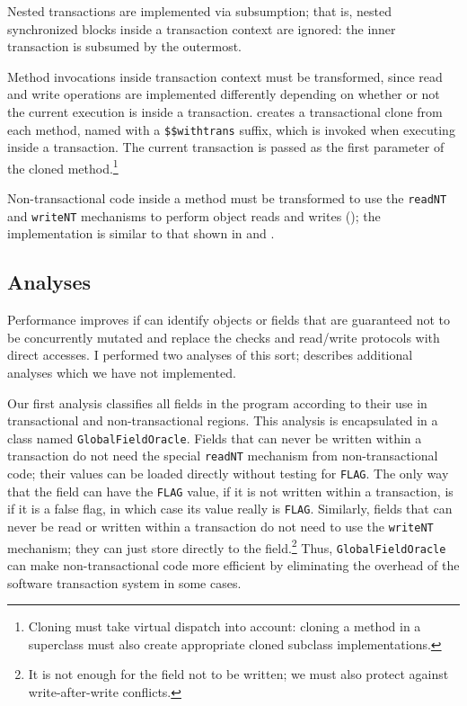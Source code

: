 Nested transactions are implemented via subsumption; that is, nested
synchronized blocks inside a transaction context are ignored: the
inner transaction is subsumed by the outermost.

\label{sec:withtrans}
Method invocations inside transaction context must be transformed,
since read and write operations are implemented differently depending
on whether or not the current execution is inside a transaction.  \Flex
creates a transactional clone from each method, named with a
\texttt{\$\$withtrans} suffix, which is invoked when executing
inside a transaction.  The current transaction is passed as the first
parameter of the cloned method.\footnote{Cloning must take virtual
  dispatch into account: cloning a method in a superclass must also
  create appropriate cloned subclass implementations.}

Non-transactional code inside a method must be transformed to use the
\texttt{readNT} and \texttt{writeNT} mechanisms to perform object
reads and writes (); the implementation is similar to
that shown in  and .

\subsection{Analyses}\label{sec:hoist} %
Performance improves if \flex can identify objects or fields
that are guaranteed not to be concurrently mutated and replace the
checks and read/write protocols with direct accesses.  I performed two
analyses of this sort;  describes additional analyses
which we have not implemented.

Our first analysis classifies all fields in the program according to
their use in transactional and non-transactional regions.  This
analysis is encapsulated in a \flex class named
\texttt{GlobalFieldOracle}.  Fields that can never be written within
a transaction do not need the special \texttt{readNT} mechanism from
non-transactional code; their values can be loaded directly without
testing for \texttt{FLAG}.  The only way that the field can have the
\texttt{FLAG} value, if it is not written within a transaction, is if
it is a false flag, in which case its value really is \texttt{FLAG}.
Similarly, fields that can never be read or written within a
transaction do not need to use the \texttt{writeNT} mechanism; they
can just store directly to the field.\footnote{It is not
  enough for the field not to be written; we must also protect against
  write-after-write conflicts.}  Thus, \texttt{GlobalFieldOracle} can
make non-transactional code more efficient by eliminating the overhead
of the software transaction system in some cases.


